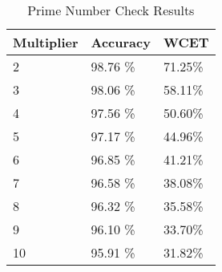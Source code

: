 \begin{table}[]
  \centering
  \caption{Prime Number Check Results}
  \label{primeT}
  \begin{tabular}{|l|l|l|}
    \hline
    \textbf{Multiplier} & \textbf{Accuracy}  & \textbf{WCET}   \\ \hline
2 &  98.76
\% &71.25\%   \\ \hline
3 &  98.06
\% &58.11\%   \\ \hline
4 &  97.56
\% &50.60\%   \\ \hline
5 &  97.17
\% &44.96\%   \\ \hline
6 &  96.85
\% &41.21\%   \\ \hline
7 &  96.58
\% &38.08\%   \\ \hline
8 &  96.32
\% &35.58\%   \\ \hline
9 &  96.10
\% &33.70\%   \\ \hline
10 &  95.91
\% &31.82\%   \\ \hline
  \end{tabular}
\end{table}

